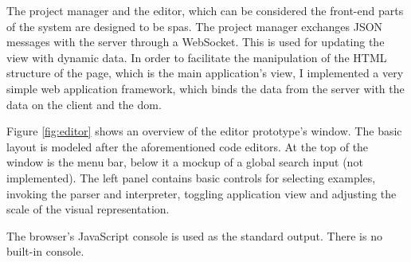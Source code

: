 The project manager and the editor, which can be considered the front-end parts
of the system are designed to be \acrlong{spa}s\cite{spa_wikipedia}. The
project manager exchanges JSON messages with the server through a WebSocket. This is used for updating the view with dynamic data. In order to facilitate the manipulation of the HTML structure of the page, which is the main application's view, I implemented a very simple web application framework, which
binds the data from the server with the data on the client and the
\acrlong{dom}\cite[Chapter~13]{eloquentjs}.

Figure \ref{fig:editor} shows an overview of the editor prototype's window. The
basic layout is modeled after the aforementioned code editors. At the top of the
window is the menu bar, below it a mockup of a global search input (not implemented). The left panel contains basic controls for selecting examples,
invoking the parser and interpreter, toggling application view and adjusting the
scale of the visual representation.

The browser's JavaScript console is used as the standard output. There is no built-in console.

